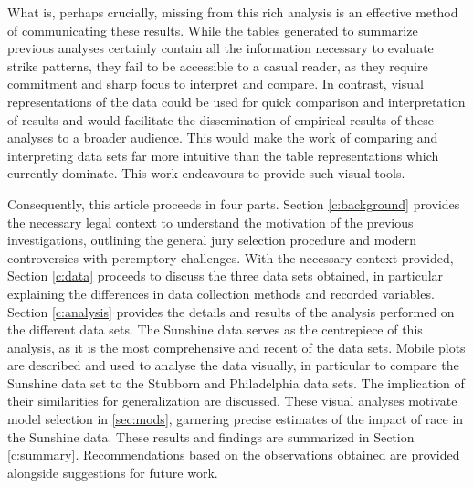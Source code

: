 What is, perhaps crucially, missing from this rich analysis is an effective method of communicating these results. While the
tables generated to summarize previous analyses certainly contain
all the information necessary to evaluate strike patterns, they fail
to be accessible to a casual reader, as they require commitment and sharp focus to interpret and compare. In contrast, visual
representations of the data could be used for quick
comparison and interpretation of results and would facilitate the dissemination of
empirical results of these analyses to a broader audience. This would make the work of comparing and interpreting data sets far
more intuitive than the table representations which currently dominate. This work endeavours to provide such visual tools.

Consequently, this article proceeds in four parts. Section \ref{c:background} provides the necessary legal context to understand the
motivation of the previous investigations, outlining the general jury selection procedure and modern controversies with peremptory challenges. With the necessary context provided, Section \ref{c:data} proceeds to discuss the three data sets obtained, in particular explaining the differences in data collection methods and recorded variables. Section \ref{c:analysis} provides the details and results
of the analysis performed on the different data sets. The Sunshine data serves as the centrepiece of this analysis, as it is the most comprehensive and recent of the data sets. Mobile plots are described and used to analyse the data visually, in particular to compare the Sunshine data set to the Stubborn and Philadelphia data sets. The implication of their similarities for generalization are discussed. These visual analyses motivate
model selection in \ref{sec:mods}, garnering precise estimates of the impact of race in the Sunshine data. These results and
findings are summarized in Section \ref{c:summary}. Recommendations based on the observations obtained are provided alongside suggestions for future work.
